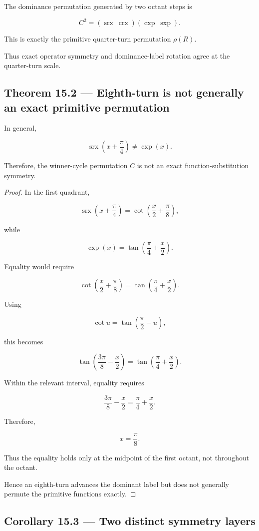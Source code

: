 \documentclass[11pt,oneside,openany]{book}
\newcommand{\PCsubsection}[1]{%
  \subsection*{#1}%
}
\begin{document}
The dominance permutation generated by two octant steps is

\[
C^2 = (\operatorname{srx}\ \operatorname{crx}) (\operatorname{cxp}\ \operatorname{sxp}).
\]

This is exactly the primitive quarter-turn permutation \(\rho(R)\).

Thus exact operator symmetry and dominance-label rotation agree at the quarter-turn scale.

\PCsubsection{Theorem 15.2 --- Eighth-turn is not generally an exact primitive permutation}

In general,

\[
\boxed{ \operatorname{srx}\left(x+\frac{\pi}{4}\right) \neq \operatorname{cxp}(x). }
\]

Therefore, the winner-cycle permutation \(C\) is not an exact function-substitution symmetry.

\begin{proof}
In the first quadrant,

\[
\operatorname{srx}\left(x+\frac{\pi}{4}\right) = \cot\left( \frac x2+\frac{\pi}{8} \right),
\]

while

\[
\operatorname{cxp}(x) = \tan\left( \frac{\pi}{4}+\frac x2 \right).
\]

Equality would require

\[
\cot\left( \frac x2+\frac{\pi}{8} \right) = \tan\left( \frac{\pi}{4}+\frac x2 \right).
\]

Using

\[
\cot u=\tan\left(\frac{\pi}{2}-u\right),
\]

this becomes

\[
\tan\left( \frac{3\pi}{8}-\frac x2 \right) = \tan\left( \frac{\pi}{4}+\frac x2 \right).
\]

Within the relevant interval, equality requires

\[
\frac{3\pi}{8}-\frac x2 = \frac{\pi}{4}+\frac x2.
\]

Therefore,

\[
x=\frac{\pi}{8}.
\]

Thus the equality holds only at the midpoint of the first octant, not throughout the octant.

Hence an eighth-turn advances the dominant label but does not generally permute the primitive functions exactly.

\end{proof}

\PCsubsection{Corollary 15.3 --- Two distinct symmetry layers}
\end{document}
